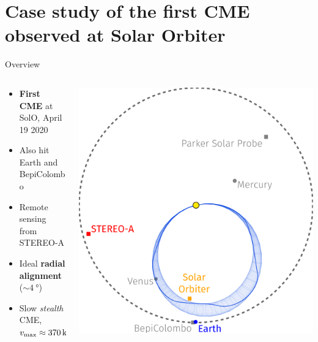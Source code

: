 \documentclass[10pt,aspectratio=169,usenames,dvipsnames]{beamer}
\newcommand{\maxt}{\ensuremath\text{max}}
\begin{document}
\section{Case study of the first CME observed at Solar Orbiter}

\begin{frame}{Overview}
    \begin{columns}
        \begin{column}{0.4\textwidth}
            \begin{itemize}
                \item \textbf{First CME} at SolO, April 19 2020
                \item Also hit Earth and BepiColombo
                \item Remote sensing from STEREO-A
                \item Ideal \textbf{radial alignment} ($\sim\SI{4}{\degree}$)
                \item Slow \textit{stealth} CME, $v_\maxt \approx \SI{370}{\kilo\meter\per\second}$
            \end{itemize}
        \end{column}
        \begin{column}{0.5\textwidth}
        	\vskip2mm
            \includegraphics[width=\textwidth]{plots/3dcore_visual_davies_new_panela.pdf}
        \end{column}
    \end{columns}
\end{frame}
\end{document}
